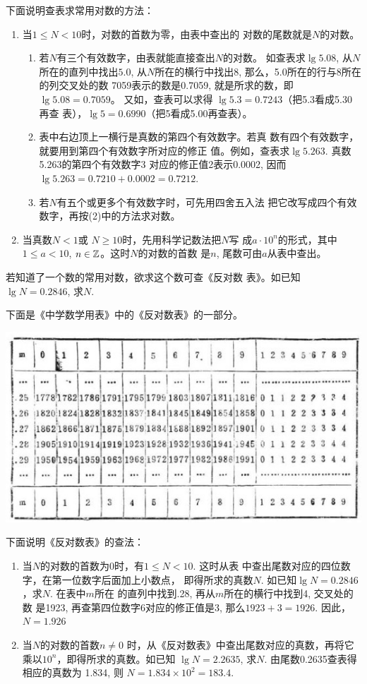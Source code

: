  
下面说明查表求常用对数的方法：
\begin{enumerate}
    \item 当$1\le N<10$时，对数的首数为零，由表中查出的
对数的尾数就是$N$的对数。
\begin{enumerate}[(1)]
 \item 若$N$有三个有效数字，由表就能直接查出$N$的对数。
如查表求$\lg 5.08$, 从$N$所在的直列中找出$5.0$, 从$N$所在的横行中找出8, 那么，5.0所在的行与8所在的列交叉处的数
7059表示的数是0.7059, 就是所求的数，即$\lg5.08=0.7059$。
又如，查表可以求得
$\lg5.3=0.7243$（把5.3看成5.30再查
表），$\lg5=0.6990$（把5看成5.00再查表）。
\item 表中右边顶上一横行是真数的第四个有效数字。若真
数有四个有效数字，就要用到第四个有效数字所对应的修正
值。例如，查表求$\lg5.263$. 真数5.263的第四个有效数字3
对应的修正值2表示0.0002, 因而
$\lg5.263=0.7210+0.0002=0.7212$.
\item 若$N$有五个或更多个有效数字时，可先用四舍五入法
把它改写成四个有效数字，再按(2)中的方法求对数。
\end{enumerate}

\item 当真数$N<1$或
$N\ge 10$时，先用科学记数法把$N$写
成$a\cdot 10^n$的形式，其中
$1\le a<10$, $n\in\mathbb{Z}$。这时$N$的对数的首数
是$n$, 尾数可由$a$从表中查出。
\end{enumerate}

若知道了一个数的常用对数，欲求这个数可查《反对数
表》。如已知$\lg N=0.2846$, 求$N$.

下面是《中学数学用表》中的《反对数表》的一部分。
\begin{center}
    \includegraphics[scale=.8]{fig/2.jpg}
\end{center}

下面说明《反对数表》的查法：
\begin{enumerate}
    \item 当$N$的对数的首数为0时，有$1\le N<10$. 这时从表
中查出尾数对应的四位数字，在第一位数字后面加上小数点，
即得所求的真数$N$. 如已知$\lg N=0.2846$
，求$N$. 在表中$m$所在
的直列中找到.28, 再从$m$所在的横行中找到4, 交叉处的数
是1923, 再查第四位数字6对应的修正值是3, 那么$1923+
3=1926$. 因此，
$N=1.926$
\item 当$N$的对数的首数$n\ne 0$
时，从《反对数表》中查出尾数对应的真数，再将它乘以$10^n$，即得所求的真数。如已知
$\lg N=2.2635$, 求$N$. 由尾数0.2635查表得相应的真数为
1.834, 则
$N=1.834\times 10^2=183.4$.
\end{enumerate}

